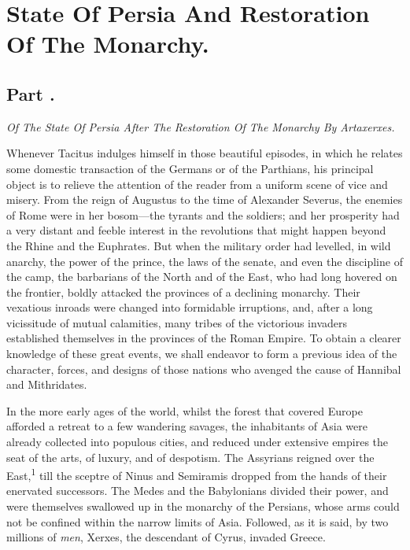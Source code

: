 \chapter{State Of Persia And Restoration Of The Monarchy.}
\section{Part \thesection.}

\textit{Of The State Of Persia After The Restoration Of The Monarchy By Artaxerxes.}
\vspace{\onelineskip}

Whenever Tacitus indulges himself in those beautiful episodes, in
which he relates some domestic transaction of the Germans or of
the Parthians, his principal object is to relieve the attention
of the reader from a uniform scene of vice and misery. From the
reign of Augustus to the time of Alexander Severus, the enemies
of Rome were in her bosom—the tyrants and the soldiers; and her
prosperity had a very distant and feeble interest in the
revolutions that might happen beyond the Rhine and the Euphrates.
But when the military order had levelled, in wild anarchy, the
power of the prince, the laws of the senate, and even the
discipline of the camp, the barbarians of the North and of the
East, who had long hovered on the frontier, boldly attacked the
provinces of a declining monarchy. Their vexatious inroads were
changed into formidable irruptions, and, after a long vicissitude
of mutual calamities, many tribes of the victorious invaders
established themselves in the provinces of the Roman Empire. To
obtain a clearer knowledge of these great events, we shall
endeavor to form a previous idea of the character, forces, and
designs of those nations who avenged the cause of Hannibal and
Mithridates.

In the more early ages of the world, whilst the forest that
covered Europe afforded a retreat to a few wandering savages, the
inhabitants of Asia were already collected into populous cities,
and reduced under extensive empires the seat of the arts, of
luxury, and of despotism. The Assyrians reigned over the East,\textsuperscript{1}
till the sceptre of Ninus and Semiramis dropped from the hands of
their enervated successors. The Medes and the Babylonians divided
their power, and were themselves swallowed up in the monarchy of
the Persians, whose arms could not be confined within the narrow
limits of Asia. Followed, as it is said, by two millions of
\textit{men}, Xerxes, the descendant of Cyrus, invaded Greece.

